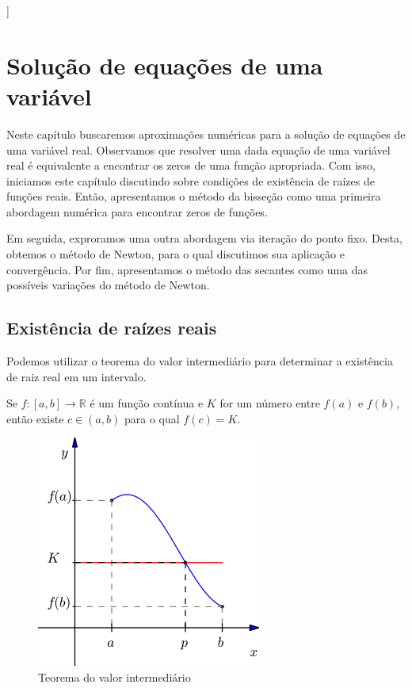 ]%

%

\chapter{Solução de equações de uma variável}

Neste capítulo buscaremos aproximações numéricas para a solução de equações de uma variável real. Observamos que resolver uma dada equação de uma variável real é equivalente a encontrar os zeros de uma função apropriada. Com isso, iniciamos este capítulo discutindo sobre condições de existência de raízes de funções reais. Então, apresentamos o método da bisseção como uma primeira abordagem numérica para encontrar zeros de funções.

Em seguida, exproramos uma outra abordagem via iteração do ponto fixo. Desta, obtemos o método de Newton, para o qual discutimos sua aplicação e convergência. Por fim, apresentamos o método das secantes como uma das possíveis variações do método de Newton.

\section{Existência de raízes reais}

Podemos utilizar o teorema do valor intermediário para determinar a existência de raiz real em um intervalo.

\begin{teo}
Se $f:[a,b]\to\mathbb{R}$ é um função contínua e $K$ for um número entre $f(a)$ e $f(b)$, então existe $c\in(a,b)$ para o qual $f(c)=K$.
\end{teo}

\begin{figure}[h!]
  \centering
  \includegraphics[scale=0.5]{./cap_equacao1d/pics/teorema_do_valor_intermediario/teorema_do_valor_intermediario.png}
  \caption{Teorema do valor intermediário}
  \label{fig:teorema_do_valor_intermediario}
\end{figure}

